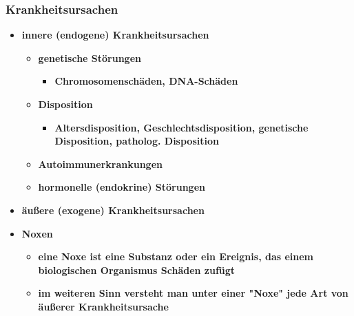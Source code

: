 \subsubsection{Krankheitsursachen}
	\begin{itemize}
		\item \textbf{innere (endogene) Krankheitsursachen}
			\begin{itemize}
				\item \textbf{genetische Störungen}
					\begin{itemize}
						\item \textbf{Chromosomenschäden, DNA-Schäden}
					\end{itemize}
				\item \textbf{Disposition}
					\begin{itemize}
						\item \textbf{Altersdisposition, Geschlechtsdisposition, genetische Disposition, patholog. Disposition}
					\end{itemize}
				\item \textbf{Autoimmunerkrankungen}
				\item \textbf{hormonelle (endokrine) Störungen}
			\end{itemize}
		\item \textbf{äußere (exogene) Krankheitsursachen}
		\item \textbf{Noxen}
			\begin{itemize}
				\item \textbf{eine Noxe ist eine Substanz oder ein Ereignis, das einem biologischen Organismus Schäden zufügt}
				\item \textbf{im weiteren Sinn versteht man unter einer "Noxe" jede Art von äußerer Krankheitsursache}
			\end{itemize}
	\end{itemize}
\pagebreak

